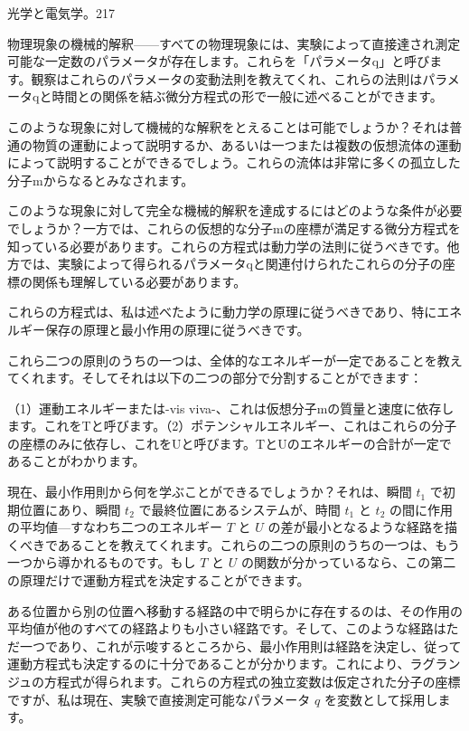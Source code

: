 \documentclass[a4paper,11pt,openany]{ltjsbook}
\begin{document}
光学と電気学。217

物理現象の機械的解釈——すべての物理現象には、実験によって直接達され測定可能な一定数のパラメータが存在します。これらを「パラメータq」と呼びます。観察はこれらのパラメータの変動法則を教えてくれ、これらの法則はパラメータqと時間との関係を結ぶ微分方程式の形で一般に述べることができます。

このような現象に対して機械的な解釈をとえることは可能でしょうか？それは普通の物質の運動によって説明するか、あるいは一つまたは複数の仮想流体の運動によって説明することができるでしょう。これらの流体は非常に多くの孤立した分子mからなるとみなされます。

このような現象に対して完全な機械的解釈を達成するにはどのような条件が必要でしょうか？一方では、これらの仮想的な分子mの座標が満足する微分方程式を知っている必要があります。これらの方程式は動力学の法則に従うべきです。他方では、実験によって得られるパラメータqと関連付けられたこれらの分子の座標の関係も理解している必要があります。

これらの方程式は、私は述べたように動力学の原理に従うべきであり、特にエネルギー保存の原理と最小作用の原理に従うべきです。

これら二つの原則のうちの一つは、全体的なエネルギーが一定であることを教えてくれます。そしてそれは以下の二つの部分で分割することができます：

（1）運動エネルギーまたは-vis viva-、これは仮想分子mの質量と速度に依存します。これをTと呼びます。（2）ポテンシャルエネルギー、これはこれらの分子の座標のみに依存し、これをUと呼びます。TとUのエネルギーの合計が一定であることがわかります。

現在、最小作用則から何を学ぶことができるでしょうか？それは、瞬間 \(t_1\) で初期位置にあり、瞬間 \(t_2\) で最終位置にあるシステムが、時間 \(t_1\) と \(t_2\) の間に作用の平均値—すなわち二つのエネルギー \(T\) と \(U\) の差が最小となるような経路を描くべきであることを教えてくれます。これらの二つの原則のうちの一つは、もう一つから導かれるものです。もし \(T\) と \(U\) の関数が分かっているなら、この第二の原理だけで運動方程式を決定することができます。

ある位置から別の位置へ移動する経路の中で明らかに存在するのは、その作用の平均値が他のすべての経路よりも小さい経路です。そして、このような経路はただ一つであり、これが示唆するところから、最小作用則は経路を決定し、従って運動方程式も決定するのに十分であることが分かります。これにより、ラグランジュの方程式が得られます。これらの方程式の独立変数は仮定された分子の座標ですが、私は現在、実験で直接測定可能なパラメータ \(q\) を変数として採用します。
\end{document}
